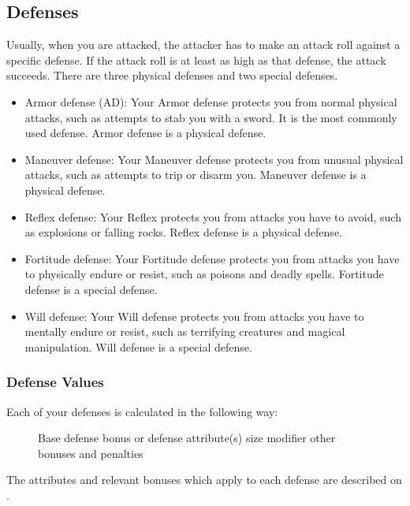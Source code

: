\subsection{Defenses}\label{Defenses}
Usually, when you are attacked, the attacker has to make an attack roll against a specific defense. If the attack roll is at least as high as that defense, the attack succeeds. There are three physical defenses and two special defenses.
\begin{itemize}
    \item Armor defense (AD): Your Armor defense protects you from normal physical attacks, such as attempts to stab you with a sword. It is the most commonly used defense. Armor defense is a physical defense.
    \item Maneuver defense: Your Maneuver defense protects you from unusual physical attacks, such as attempts to trip or disarm you. Maneuver defense is a physical defense.
    \item Reflex defense: Your Reflex protects you from attacks you have to avoid, such as explosions or falling rocks. Reflex defense is a physical defense.
    \item Fortitude defense: Your Fortitude defense protects you from attacks you have to physically endure or resist, such as poisons and deadly spells. Fortitude defense is a special defense. 
    \item Will defense: Your Will defense protects you from attacks you have to mentally endure or resist, such as terrifying creatures and magical manipulation. Will defense is a special defense.
\end{itemize}

\subsubsection{Defense Values}

Each of your defenses is calculated in the following way:

\begin{figure}[h]
     \add Base defense bonus or defense attribute(s)  \add size modifier \add other bonuses and penalties
\end{figure}

The attributes and relevant bonuses which apply to each defense are described on .

